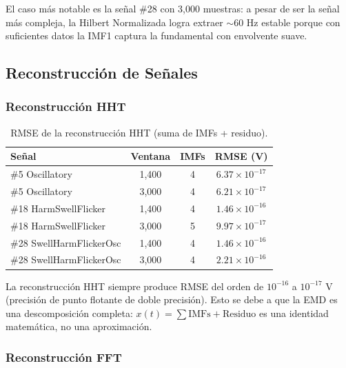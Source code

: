\documentclass[12pt,a4paper]{article}
\begin{document}
El caso más notable es la señal \#28 con 3{,}000 muestras: a pesar de ser la señal más compleja, la Hilbert Normalizada logra extraer $\sim$60 Hz estable porque con suficientes datos la IMF1 captura la fundamental con envolvente suave.


\subsection{Reconstrucción de Señales}

\subsubsection{Reconstrucción HHT}

\begin{table}[H]
\centering
\caption{RMSE de la reconstrucción HHT (suma de IMFs + residuo).}
\begin{tabular}{@{}lccc@{}}
\toprule
\textbf{Señal} & \textbf{Ventana} & \textbf{IMFs} & \textbf{RMSE (V)} \\
\midrule
\#5 Oscillatory & 1{,}400 & 4 & $6.37 \times 10^{-17}$ \\
\#5 Oscillatory & 3{,}000 & 4 & $6.21 \times 10^{-17}$ \\
\#18 HarmSwellFlicker & 1{,}400 & 4 & $1.46 \times 10^{-16}$ \\
\#18 HarmSwellFlicker & 3{,}000 & 5 & $9.97 \times 10^{-17}$ \\
\#28 SwellHarmFlickerOsc & 1{,}400 & 4 & $1.46 \times 10^{-16}$ \\
\#28 SwellHarmFlickerOsc & 3{,}000 & 4 & $2.21 \times 10^{-16}$ \\
\bottomrule
\end{tabular}
\label{tab:rmse_hht}
\end{table}

La reconstrucción HHT siempre produce RMSE del orden de $10^{-16}$ a $10^{-17}$ V (precisión de punto flotante de doble precisión). Esto se debe a que la EMD es una descomposición completa: $x(t) = \sum \text{IMFs} + \text{Residuo}$ es una identidad matemática, no una aproximación.


\subsubsection{Reconstrucción FFT}
\end{document}

